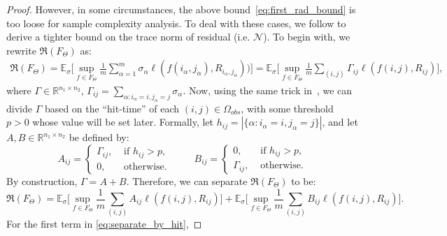 \documentclass[twoside,11pt]{article}
\def\R{\mathbb{R}}
\def\Obs{\Omega_{obs}}
\newcommand\Ex[2]{{\mathbb E}_{#1}\big[#2\big]}
\def\nmax{{\mathcal N}}
\def\rad{{\mathfrak R}}
\begin{document}
\begin{proof}
However, in some circumstances, the above bound~\eqref{eq:first_rad_bound}
is too loose for sample complexity analysis.
To deal with these cases, we follow \citet{Shamir14a} to derive a tighter bound on the trace norm of residual (i.e. $\nmax$).
To begin with, we rewrite $\rad(F_{\Theta})$ as:
\begin{align*}
  \rad(F_{\Theta}) = \Ex{\sigma}{\sup_{f\in F_{\Theta}}\frac{1}{m} \sum_{\alpha=1}^m \sigma_\alpha \ell(f(i_\alpha, j_\alpha), R_{i_\alpha, j_\alpha}))}
  = \Ex{\sigma}{\sup_{f\in F_{\Theta}}\frac{1}{m} \sum_{(i,j)}\Gamma_{ij} \ell(f(i,j), R_{ij})},
\end{align*}
where $\Gamma \in \R^{n_1 \times n_2}$, $\Gamma_{ij} = \sum_{\alpha:i_\alpha = i, j_\alpha = j} \sigma_\alpha$.
Now, using the same trick in~\citet{Shamir14a}, we can divide $\Gamma$ based on the ``hit-time'' of each $(i, j) \in \Obs$, with
some threshold $p > 0$ whose value will be set later.  Formally, let $h_{ij} = |\{\alpha: i_\alpha = i, j_\alpha = j\}|$,
and let $A, B\in \R^{n_1 \times n_2}$ be defined by:
\begin{equation*}
  A_{ij} = \begin{cases}
    \Gamma_{ij}, &\text{ if $h_{ij} > p$}, \\
    0, &\text{ otherwise}.
    \end{cases}
  \hspace{1cm}
  B_{ij} = \begin{cases}
    0, &\text{ if $h_{ij} > p$}, \\
    \Gamma_{ij}, &\text{ otherwise}.
  \end{cases}
\end{equation*}
By construction, $\Gamma = A+B$.  Therefore, we can separate $\rad(F_{\Theta})$ to be:
\begin{equation}
  \rad(F_{\Theta}) = \Ex{\sigma}{\sup_{f\in F_{\Theta}}\frac{1}{m} \sum_{(i,j)}A_{ij} \ell(f(i,j), R_{ij})}
  +\Ex{\sigma}{\sup_{f\in F_{\Theta}}\frac{1}{m} \sum_{(i,j)}B_{ij} \ell(f(i,j), R_{ij})}.
  \label{eq:separate_by_hit}
\end{equation}
For the first term in \eqref{eq:separate_by_hit},

\end{proof}
\end{document}
